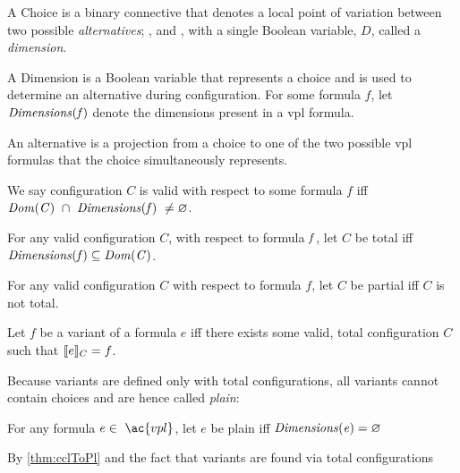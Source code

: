 \begin{definition}[Choice]
  A Choice  is a binary connective that denotes a local
  point of variation between two possible \textit{alternatives}; , and
  , with a single Boolean variable, $D$, called a \textit{dimension}.
\end{definition}

\begin{definition}[Dimension]
  A Dimension is a Boolean variable that represents a choice and is used to
  determine an alternative during configuration. For some formula $f$, let
  $\mathit{Dimensions(f)}$ denote the dimensions present in a \ac{vpl} formula.
\end{definition}

\begin{definition}[Alternative]
  An alternative is a projection from a choice to one of the two possible
  \ac{vpl} formulas that the choice simultaneously represents.
\end{definition}

\begin{definition}
  We say configuration $C$ is valid with respect to some formula $f$ iff
  $\kf{Dom(C)}\ \cap\ \kf{Dimensions(\kf{f})\ \neq \varnothing}$.
\end{definition}

\begin{definition}
    \label{tot:conf}
    For any valid configuration $C$, with respect to formula $\mathit{f}$, let
    $C$ be total iff $\mathit{Dimensions(f) \subseteq Dom(C)}$.
\end{definition}
%
\begin{corollary}
  For any valid configuration $C$ with respect to formula $f$, let $C$ be
  partial iff $C$ is not total.
\end{corollary}
\begin{definition}[Variant]
  Let $f$ be a variant of a formula $e$ iff there exists some
  valid, total configuration $C$ such that $\sem[C]{e} = f$.
\end{definition}

Because variants are defined only with total configurations, all variants cannot
contain choices and are hence called \textit{plain}:

\begin{definition}
  For any formula $e \in\ \ac{vpl}$, let $e$ be plain iff $\mathit{Dimensions(e)}
  = \varnothing$
\end{definition}
%
\begin{lemma}
  By \autoref{thm:cclToPl} and the fact that variants are found via total
  configurations
\end{lemma}


